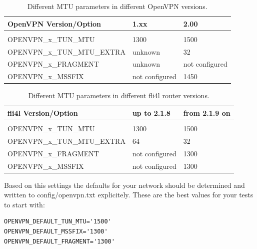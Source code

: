 \begin{table}[htbp]
  \begin{scriptsize}
    \begin{tabular}{lll}
      OpenVPN Version/Option        & 1.xx                & 2.00        \\
      \hline                                                    \\
      OPENVPN\_x\_TUN\_MTU          & 1300                & 1500        \\
      OPENVPN\_x\_TUN\_MTU\_EXTRA   & unknown             & 32          \\
      OPENVPN\_x\_FRAGMENT          & unknown             & not configured \\
      OPENVPN\_x\_MSSFIX            & not configured	  & 1450        \\
    \end{tabular}
  \end{scriptsize}
  \caption{Different MTU parameters in different OpenVPN versions.}
\end{table}

\begin{table}[htbp]
  \begin{scriptsize}
    \begin{tabular}{lll}
      fli4l Version/Option          & up to 2.1.8  	  & from 2.1.9 on \\
      \hline                                                    \\
      OPENVPN\_x\_TUN\_MTU          & 1300                & 1500        \\
      OPENVPN\_x\_TUN\_MTU\_EXTRA   & 64                  & 32          \\
      OPENVPN\_x\_FRAGMENT          & not configured	  & 1300        \\
      OPENVPN\_x\_MSSFIX            & not configured	  & 1300        \\
    \end{tabular}
  \end{scriptsize}
  \caption{Different MTU parameters in different fli4l router versions.}
\end{table}

Based on this settings the defaults for your network should be determined 
and written to config/openvpn.txt explicitely. These are the best values for 
your tests to start with:

\begin{example}
\begin{verbatim}
OPENVPN_DEFAULT_TUN_MTU='1500'
OPENVPN_DEFAULT_MSSFIX='1300'
OPENVPN_DEFAULT_FRAGMENT='1300'
\end{verbatim}
\end{example}

